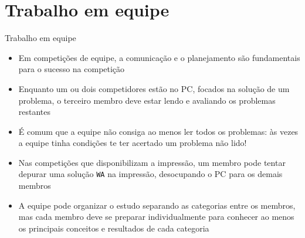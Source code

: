 \section{Trabalho em equipe}

\begin{frame}[fragile]{Trabalho em equipe}

    \begin{itemize}
        \item Em competições de equipe, a comunicação e o planejamento são fundamentais para o
            sucesso na competição

        \item Enquanto um ou dois competidores estão no PC, focados na solução de um problema,
            o terceiro membro deve estar lendo e avaliando os problemas restantes

        \item É comum que a equipe não consiga ao menos ler todos os problemas: às vezes a equipe
            tinha condições te ter acertado um problema não lido!

        \item Nas competições que disponibilizam a impressão, um membro pode tentar depurar uma
            solução \texttt{WA} na impressão, desocupando o PC para os demais membros

        \item A equipe pode organizar o estudo separando as categorias entre os membros, mas cada
            membro deve se preparar individualmente para conhecer ao menos os principais conceitos
            e resultados de cada categoria
    \end{itemize}

\end{frame}

